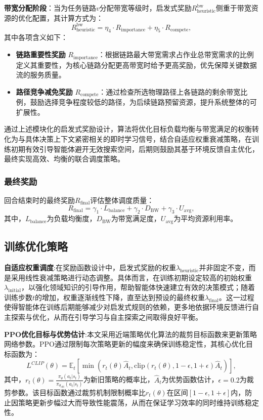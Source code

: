 \textbf{带宽分配阶段}：当为任务链路$v$分配带宽等级时，启发式奖励$R_{\text{heuristic}}^{\text{bw}}$侧重于带宽资源的优化配置，其计算方式为：
\begin{equation}
R_{\text{heuristic}}^{\text{bw}} = \eta_4 \cdot R_{\text{importance}} + \eta_5 \cdot R_{\text{compete}},
\end{equation}
其中各项含义如下：
\begin{itemize}
    \item \textbf{链路重要性奖励} $R_{\text{importance}}$：根据链路最大带宽需求占作业总带宽需求的比例定义其重要性，为核心链路分配更高带宽时给予更高奖励，优先保障关键数据流的服务质量。
    \item \textbf{路径竞争减免奖励} $R_{\text{compete}}$：通过检查所选物理路径上各链路的剩余带宽比例，鼓励选择竞争程度较低的路径，为后续链路预留资源，提升系统整体的可扩展性。
\end{itemize}

通过上述模块化的启发式奖励设计，算法将优化目标负载均衡与带宽满足的权衡转化为与具体决策上下文紧密相关的即时学习信号，结合自适应权重衰减策略，在训练初期有效引导智能体避开无效搜索空间，后期则鼓励其基于环境反馈自主优化，最终实现高效、均衡的联合调度策略。
\subsubsection{最终奖励}
回合结束时的最终奖励$R_{\text{final}}$评估整体调度质量：
\begin{equation}
R_{\text{final}} = \gamma_1 \cdot L_{\text{balance}} + \gamma_2 \cdot D_{\text{BW}} + \gamma_3 \cdot U_{\text{avg}},
\end{equation}
其中，$L_{\text{balance}}$为负载均衡度，$D_{\text{BW}}$为带宽满足度，$U_{\text{avg}}$为平均资源利用率。

\subsection{训练优化策略}
\textbf{自适应权重调度}:在奖励函数设计中，启发式奖励的权重$\lambda_{\text{heuristic}}$并非固定不变，而是采用线性衰减策略进行动态调整。具体而言，在训练初期设定较高的初始权重$\lambda_{\text{initial}}$，以强化领域知识的引导作用，帮助智能体快速建立有效的决策模式；随着训练步数$t$的增加，权重逐渐线性下降，直至达到预设的最终权重$\lambda_{\text{final}}$。这一过程使得智能体在训练后期能够减少对启发式规则的依赖，更多地依据环境反馈进行自主探索与优化，从而在引导学习与自主探索之间取得良好平衡。

\textbf{PPO优化目标与优势估计}:本文采用近端策略优化算法的裁剪目标函数来更新策略网络参数。PPO通过限制每次策略更新的幅度来确保训练稳定性，其核心优化目标函数为：
\begin{equation}
    L^{CLIP}(\theta) = \mathbb{E}_t[\min(r_t(\theta)\hat{A}_t, \text{clip}(r_t(\theta), 1-\epsilon, 1+\epsilon)\hat{A}_t)],
\end{equation}
其中，$r_t(\theta) = \frac{\pi_\theta(a_t|s_t)}{\pi_{\theta_{\text{old}}}(a_t|s_t)}$为新旧策略的概率比，$\hat{A}_t$为优势函数估计，$\epsilon=0.2$为裁剪参数。该目标函数通过裁剪机制限制概率比$r_t(\theta)$在区间$[1-\epsilon, 1+\epsilon]$内，防止因策略更新步幅过大而导致性能震荡，从而在保证学习效率的同时维持训练稳定性。

